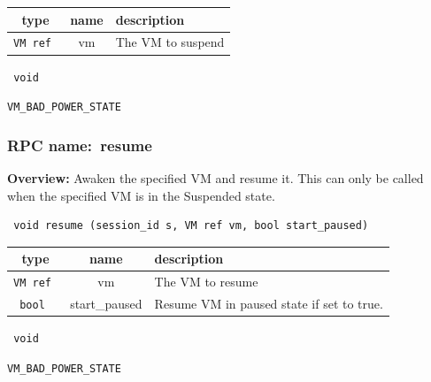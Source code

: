  
\vspace{0.3cm}
\begin{tabular}{|c|c|p{7cm}|}
 \hline
{\bf type} & {\bf name} & {\bf description} \\ \hline
{\tt VM ref } & vm & The VM to suspend \\ \hline 

\end{tabular}

\vspace{0.3cm}

{\tt 
void
}



\vspace{0.3cm}

 {\tt VM\_BAD\_POWER\_STATE}

\vspace{0.6cm}
\subsubsection{RPC name:~resume}

{\bf Overview:} 
Awaken the specified VM and resume it.  This can only be called when the
specified VM is in the Suspended state.

\begin{verbatim} void resume (session_id s, VM ref vm, bool start_paused)\end{verbatim}



 
\vspace{0.3cm}
\begin{tabular}{|c|c|p{7cm}|}
 \hline
{\bf type} & {\bf name} & {\bf description} \\ \hline
{\tt VM ref } & vm & The VM to resume \\ \hline 

{\tt bool } & start\_paused & Resume VM in paused state if set to true. \\ \hline 

\end{tabular}

\vspace{0.3cm}

{\tt 
void
}



\vspace{0.3cm}

 {\tt VM\_BAD\_POWER\_STATE}

